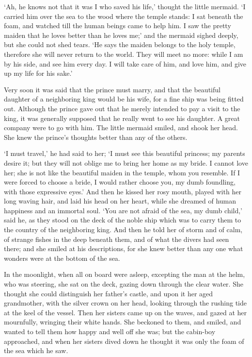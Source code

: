 `Ah, he knows not that it was I who saved his life,' thought the little mermaid.
`I carried him over the sea to the wood where the temple stands: I sat beneath the foam, and watched till the human beings came to help him.
I saw the pretty maiden that he loves better than he loves me;' and the mermaid sighed deeply, but she could not shed tears.
`He says the maiden belongs to the holy temple, therefore she will never return to the world.
They will meet no more: while I am by his side, and see him every day.
I will take care of him, and love him, and give up my life for his sake.'

Very soon it was said that the prince must marry, and that the beautiful daughter of a neighboring king would be his wife, for a fine ship was being fitted out.
Although the prince gave out that he merely intended to pay a visit to the king, it was generally supposed that he really went to see his daughter.
A great company were to go with him.
The little mermaid smiled, and shook her head.
She knew the prince’s thoughts better than any of the others.

`I must travel,' he had said to her; `I must see this beautiful princess; my parents desire it; but they will not oblige me to bring her home as my bride.
I cannot love her; she is not like the beautiful maiden in the temple, whom you resemble.
If I were forced to choose a bride, I would rather choose you, my dumb foundling, with those expressive eyes.' And then he kissed her rosy mouth, played with her long waving hair, and laid his head on her heart, while she dreamed of human happiness and an immortal soul.
`You are not afraid of the sea, my dumb child,' said he, as they stood on the deck of the noble ship which was to carry them to the country of the neighboring king.
And then he told her of storm and of calm, of strange fishes in the deep beneath them, and of what the divers had seen there; and she smiled at his descriptions, for she knew better than any one what wonders were at the bottom of the sea.

In the moonlight, when all on board were asleep, excepting the man at the helm, who was steering, she sat on the deck, gazing down through the clear water.
She thought she could distinguish her father’s castle, and upon it her aged grandmother, with the silver crown on her head, looking through the rushing tide at the keel of the vessel.
Then her sisters came up on the waves, and gazed at her mournfully, wringing their white hands.
She beckoned to them, and smiled, and wanted to tell them how happy and well off she was; but the cabin-boy approached, and when her sisters dived down he thought it was only the foam of the sea which he saw.

